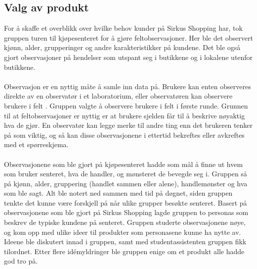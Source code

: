 \subsection{Valg av produkt}
For å skaffe et overblikk over hvilke behov kunder på Sirkus Shopping har, tok gruppen turen til kjøpesenteret for å gjøre feltobservasjoner. Her ble det observert kjønn, alder, grupperinger og andre karakteristikker på kundene. Det ble også gjort observasjoner på hendelser som utspant seg i butikkene og i lokalene utenfor butikkene. 
\\\\
Observasjon er en nyttig måte å samle inn data på. Brukere kan enten observeres direkte av en observatør i et laboratorium, eller observatøren kan observere brukere i felt \cite[s.~253]{preece}. Gruppen valgte å observere brukere i felt i første runde. Grunnen til at feltobservasjoner er nyttig er at brukere sjelden får til å beskrive nøyaktig hva de gjør. En observatør kan legge merke til andre ting enn det brukeren tenker på som viktig, og så kan disse observasjonene i ettertid bekreftes eller avkreftes med et spørreskjema. 
\\\\
Observasjonene som ble gjort på kjøpesenteret hadde som mål å finne ut hvem som bruker senteret, hva de handler, og mønsteret de bevegde seg i. Gruppen så på kjønn, alder, gruppering (handlet sammen eller alene), handlemønster og hva som ble sagt. Alt ble notert ned sammen med tid på døgnet, siden gruppen tenkte det kunne være forskjell på når ulike grupper besøkte senteret.
Basert på observasjonene som ble gjort på Sirkus Shopping lagde gruppen to personas som beskrev de typiske kundene på senteret. Gruppen studerte observasjonene nøye, og kom opp med ulike ideer til produkter som personasene kunne ha nytte av. Ideene ble diskutert innad i gruppen, samt med studentassistenten gruppen fikk tilordnet. Etter flere idémyldringer ble gruppen enige om et produkt alle hadde god tro på. 

